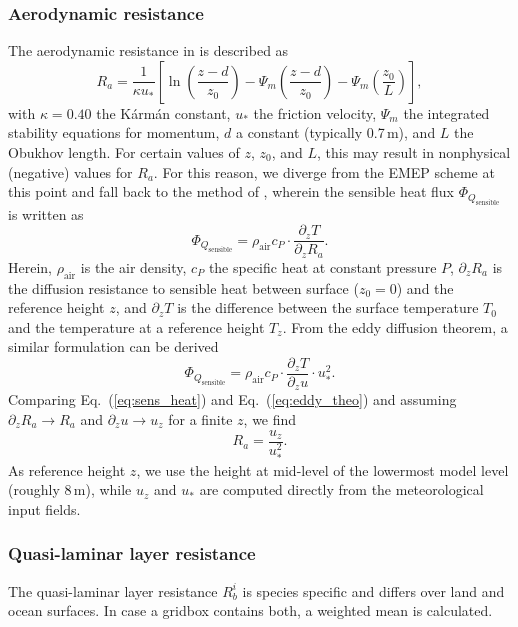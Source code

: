 \documentclass[gmd, manuscript]{copernicus}
\begin{document}
\subsubsection{Aerodynamic resistance}
\label{subsubsec:Ra}
The aerodynamic resistance in \citet{WASP:Simpson2003,ACP:Simpson2012} is described as
\begin{equation}
  R_a = \frac{1}{\kappa u_*}\left[{\ln{\left(\frac{z-d}{z_0}\right)}-\Psi_m\left(\frac{z-d}{z_0}\right)-\Psi_m\left(\frac{z_0}{L}\right)}\right],
\end{equation}
with $\kappa = 0.40$ the K\'{a}rm\'{a}n constant, $u_*$ the friction velocity, $\Psi_m$ the integrated stability equations for momentum, $d$ a constant (typically 0.7\,\unit{m}), and $L$ the Obukhov length. For certain values of $z$, $z_0$, and $L$, this may result in nonphysical (negative) values for $R_a$. For this reason, we diverge from the EMEP scheme at this point and fall back to the method of \citet{Monteith1973}, wherein the sensible heat flux $\Phi_{Q_\text{sensible}}$ is written as
\begin{equation}
  \Phi_{Q_\text{sensible}} = \rho_\text{air} c_P \cdot \frac{\partial_z T}{\partial_z R_a}.
  \label{eq:sens_heat}
\end{equation}
Herein, $\rho_\text{air}$ is the air density, $c_P$ the specific heat at constant pressure $P$, $\partial_z R_a$ is the diffusion resistance to sensible heat between surface ($z_0 = 0$) and the reference height $z$, and $\partial_z T$ is the difference between the surface temperature $T_0$ and the temperature at a reference height $T_z$. From the eddy diffusion theorem, a similar formulation can be derived
\begin{equation}
  \Phi_{Q_\text{sensible}} = \rho_\text{air} c_P \cdot \frac{\partial_z T}{\partial_z u} \cdot u_*^2.
  \label{eq:eddy_theo}
\end{equation}
Comparing Eq.~(\ref{eq:sens_heat}) and Eq.~(\ref{eq:eddy_theo}) and assuming $\partial_z R_a \rightarrow R_a $ and $\partial_z u \rightarrow u_z $ for a finite $z$, we find 
\begin{equation}
  R_a = \frac{u_z}{u_*^2}.
\end{equation}
As reference height $z$, we use the height at mid-level of the lowermost model level (roughly 8\,\unit{m}), while $u_z$ and $u_*$ are computed directly from the meteorological input fields.
\subsubsection{Quasi-laminar layer resistance}
\label{subsubsec:Rb}
The quasi-laminar layer resistance $R_b^i$ is species specific and differs over land and ocean surfaces. In case a gridbox contains both, a weighted mean is calculated.
\end{document}
